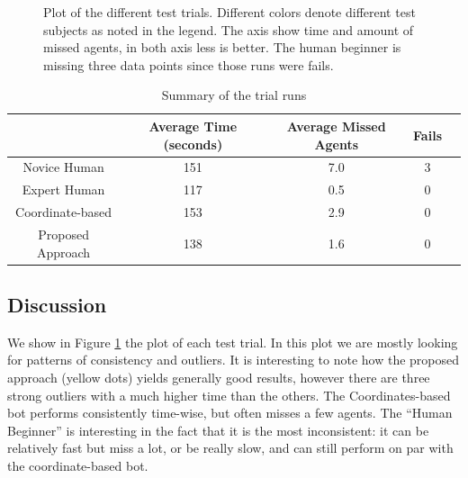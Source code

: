 \documentclass[]{article}
\begin{document}
\begin{figure}[h]
\caption{Plot of the different test trials. Different colors denote different test subjects as noted in the legend. The axis show time and amount of missed agents, in both axis less is better. The human beginner is missing three data points since those runs were fails.}
\label{results1}
\end{figure}

\begin{table}[h]
\begin{tabular}{c|c|c|c|c}
    & Average Time (seconds) & Average Missed Agents & Fails \\ \hline
    Novice Human & 151 & 7.0 & 3 \\
    Expert Human & 117 & 0.5 & 0 \\
    Coordinate-based & 153 & 2.9 & 0 \\
    Proposed Approach & 138 & 1.6 & 0 \\
\end{tabular}
\caption{Summary of the trial runs}
\label{results2}
\end{table}

\newpage
\subsection{Discussion}
We show in Figure \ref{results1} the plot of each test trial. In this plot we are mostly looking for patterns of consistency and outliers. It is interesting to note how the proposed approach (yellow dots) yields generally good results, however there are three strong outliers with a much higher time than the others. The Coordinates-based bot performs consistently time-wise, but often misses a few agents. The ``Human Beginner'' is interesting in the fact that it is the most inconsistent: it can be relatively fast but miss a lot, or be really slow, and can still perform on par with the coordinate-based bot.
\end{document}
